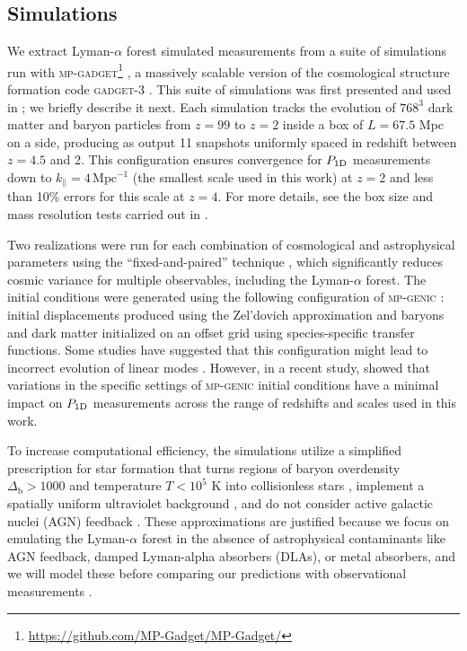 \documentclass[longauth]{aa}
\newcommand{\lyaf}{Lyman-$\alpha$ forest\xspace}
\newcommand{\poned}{\ensuremath{P_{\rm 1D}}\xspace}
\newcommand{\iMpc}{\ensuremath{\,\mathrm{Mpc}^{-1}}}
\begin{document}

\subsection{Simulations}
\label{sec:input_sims}

We extract \lyaf simulated measurements from a suite of simulations run with \textsc{mp-gadget}\footnote{\url{https://github.com/MP-Gadget/MP-Gadget/}} \citep{feng2018MpGadgetMpGadgetTag, emugp_bird2019}, a massively scalable version of the cosmological structure formation code \textsc{gadget-3} \citep[last described in][]{Gadget_Springel}. This suite of simulations was first presented and used in \citet{Pedersen2021}; we briefly describe it next. Each simulation tracks the evolution of $768^3$ dark matter and baryon particles from $z=99$ to $z=2$ inside a box of $L = 67.5$ Mpc on a side, producing as output 11 snapshots uniformly spaced in redshift between $z=4.5$ and 2. This configuration ensures convergence for \poned measurements down to $k_\parallel=4\iMpc$ (the smallest scale used in this work) at $z=2$ and less than 10\% errors for this scale at $z=4$. For more details, see the box size and mass resolution tests carried out in \citet{bolton2017SherwoodSimulationSuite}.

Two realizations were run for each combination of cosmological and astrophysical parameters using the ``fixed-and-paired'' technique \citep{angulo2016CosmologicalNbodySimulations, pontzen2016InvertedInitialConditions}, which significantly reduces cosmic variance for multiple observables, including the \lyaf \citep{fixedpaired_Villaescusa, anderson2019CosmologicalHydrodynamicSimulations}. The initial conditions were generated using the following configuration of \textsc{mp-genic} \citep{Bird2020}: initial displacements produced using the Zel'dovich approximation and baryons and dark matter initialized on an offset grid using species-specific transfer functions. Some studies have suggested that this configuration might lead to incorrect evolution of linear modes \citep{Bird2020}. However, in a recent study, \citet{Khan2024} showed that variations in the specific settings of \textsc{mp-genic} initial conditions have a minimal impact on \poned measurements across the range of redshifts and scales used in this work.

To increase computational efficiency, the simulations utilize a simplified prescription for star formation that turns regions of baryon overdensity $\Delta_\mathrm{b}>1000$ and temperature $T<10^5$ K into collisionless stars \citep[e.g.;][]{viel2004ConstraintsPrimordialPower}, implement a spatially uniform ultraviolet background \citep{haardt2012RadiativeTransferClumpya}, and do not consider active galactic nuclei (AGN) feedback \citep[e.g.;][]{chabanier2020ImpactAGNFeedback}. These approximations are justified because we focus on emulating the \lyaf in the absence of astrophysical contaminants like AGN feedback, damped Lyman-alpha absorbers (DLAs), or metal absorbers, and we will model these before comparing our predictions with observational measurements \citep[e.g.;][]{mcdonald2005LinearTheoryPower, palanque-delabrouille2015ConstraintNeutrinoMasses, palanque-delabrouille2020HintsNeutrinoBounds}.
\end{document}
